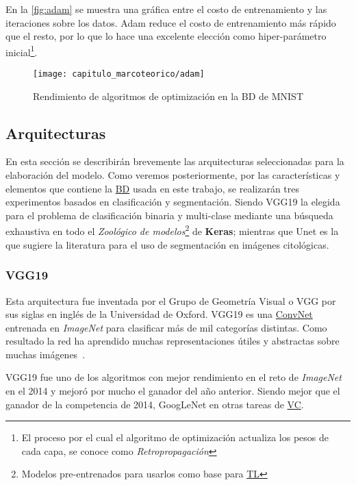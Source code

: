 En la \autoref{fig:adam} se muestra una gráfica entre el costo de entrenamiento
y las iteraciones sobre los datos. Adam reduce el costo de entrenamiento más
rápido que el resto, por lo que lo hace una excelente elección como
hiper-parámetro inicial\footnote{El proceso por el cual el algoritmo de
optimización actualiza los pesos de cada capa, se conoce como
\emph{Retropropagación}}.

\begin{figure}[H]
    \centering
    \texttt{[image: capitulo\_marcoteorico/adam]}
    \caption{Rendimiento de algoritmos de optimización en la BD de MNIST}\label{fig:adam}
\end{figure}

\subsection{Arquitecturas}

En esta sección se describirán brevemente las arquitecturas seleccionadas para
la elaboración del modelo. Como veremos posteriormente, por las características
y elementos que contiene la \hyperlink{abbr}{BD} usada en este trabajo, se
realizarán tres experimentos basados en clasificación y segmentación. Siendo
VGG19 la elegida para el problema de clasificación binaria y multi-clase
mediante una búsqueda exhaustiva en todo el \emph{Zoológico de
modelos}\footnote{Modelos pre-entrenados para usarlos como base para
\hyperlink{abbr}{TL}} de \textbf{Keras}; mientras que Unet es la que sugiere la
literatura para el uso de segmentación en imágenes citológicas. 

\subsubsection{VGG19}

Esta arquitectura fue inventada por el Grupo de Geometría Visual o VGG por sus
siglas en inglés de la Universidad de Oxford. VGG19 es una
\hyperlink{abbr}{ConvNet} entrenada en \emph{ImageNet} para clasificar más de
mil categorías distintas. Como resultado la red ha aprendido muchas
representaciones útiles y abstractas sobre muchas imágenes~\cite{Simonyan2014}. 

VGG19 fue uno de los algoritmos con mejor rendimiento en el reto de
\emph{ImageNet} en el 2014 y mejoró por mucho el ganador del año anterior.
Siendo mejor que el ganador de la competencia de 2014, GoogLeNet en otras tareas
de \hyperlink{abbr}{VC}.

